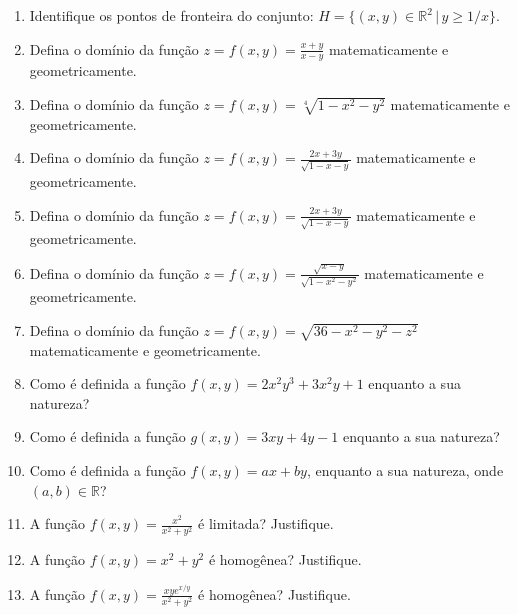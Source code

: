 \documentclass[11pt,a4paper]{article}
\begin{document}
\begin{enumerate}
\item Identifique os pontos de fronteira do conjunto: $H = \{(x,y) \in \mathbb{R}^2 \,|\, y \geq 1/x \}$.

\item Defina o domínio da função $z = f(x,y) = \displaystyle\frac{x + y}{x - y}$ matematicamente e geometricamente.

\item Defina o domínio da função $z = f(x,y) = \sqrt[4]{1 - x^2 - y^2}$ matematicamente e geometricamente.

\item Defina o domínio da função $z = f(x,y) = \displaystyle\frac{2x + 3y}{\sqrt{1-x-y}}$ matematicamente e geometricamente.

\item Defina o domínio da função $z = f(x,y) = \displaystyle\frac{2x + 3y}{\sqrt{1-x-y}}$ matematicamente e geometricamente.

\item Defina o domínio da função $z = f(x,y) = \displaystyle\frac{\sqrt{x-y}}{\sqrt{1-x^2-y^2}}$ matematicamente e geometricamente.

\item Defina o domínio da função $z = f(x,y) = \sqrt{36 - x^2 - y^2 - z^2}$ matematicamente e geometricamente.

\item Como é definida a função $f(x,y) = 2x^2y^3 + 3x^2y + 1$ enquanto a sua natureza?














\item Como é definida a função $g(x,y) = 3xy + 4y - 1$ enquanto a sua natureza?

\item Como é definida a função $f(x,y) = ax + by$, enquanto a sua natureza, onde $(a,b) \in \mathbb{R} $?

\item A função $f(x,y) = \displaystyle\frac{x^2}{x^2 + y^2}$ é limitada? Justifique.

\item A função $f(x,y) = x^2 + y^2$ é homogênea? Justifique.

\item A função $f(x,y) = \displaystyle\frac{xye^{x/y}}{x^2 + y^2}$ é homogênea? Justifique.


\end{enumerate}
\end{document}

